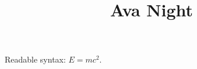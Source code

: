 \documentclass{article}
\title{Ava Night}
\begin{document}
\maketitle
Readable syntax: $E = mc^2$.
\end{document}
